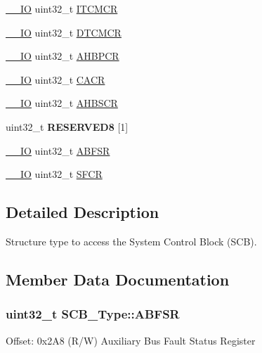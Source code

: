\begin{DoxyCompactItemize}
\item 
\hyperlink{core__sc300_8h_aec43007d9998a0a0e01faede4133d6be}{\+\_\+\+\_\+\+IO} uint32\+\_\+t \hyperlink{struct_s_c_b___type_a6f52bb11b40cad59e836366a43686d63}{I\+T\+C\+M\+CR}
\item 
\hyperlink{core__sc300_8h_aec43007d9998a0a0e01faede4133d6be}{\+\_\+\+\_\+\+IO} uint32\+\_\+t \hyperlink{struct_s_c_b___type_a1728cb36883856a3543286d9acfb8a0d}{D\+T\+C\+M\+CR}
\item 
\hyperlink{core__sc300_8h_aec43007d9998a0a0e01faede4133d6be}{\+\_\+\+\_\+\+IO} uint32\+\_\+t \hyperlink{struct_s_c_b___type_aa7154549803e08073983216c159f74e3}{A\+H\+B\+P\+CR}
\item 
\hyperlink{core__sc300_8h_aec43007d9998a0a0e01faede4133d6be}{\+\_\+\+\_\+\+IO} uint32\+\_\+t \hyperlink{struct_s_c_b___type_acc2c89b1b03bed0224952b05582ce397}{C\+A\+CR}
\item 
\hyperlink{core__sc300_8h_aec43007d9998a0a0e01faede4133d6be}{\+\_\+\+\_\+\+IO} uint32\+\_\+t \hyperlink{struct_s_c_b___type_ae1aa2246b75741ae5a7a965a66fa8d64}{A\+H\+B\+S\+CR}
\item 
uint32\+\_\+t {\bfseries R\+E\+S\+E\+R\+V\+E\+D8} \mbox{[}1\mbox{]}\hypertarget{struct_s_c_b___type_ab5acfe05b4c0828572919ef4e4e2de75}{}\label{struct_s_c_b___type_ab5acfe05b4c0828572919ef4e4e2de75}

\item 
\hyperlink{core__sc300_8h_aec43007d9998a0a0e01faede4133d6be}{\+\_\+\+\_\+\+IO} uint32\+\_\+t \hyperlink{struct_s_c_b___type_acb77619057d99c6d671915df3aa9b454}{A\+B\+F\+SR}
\item 
\hyperlink{core__sc300_8h_aec43007d9998a0a0e01faede4133d6be}{\+\_\+\+\_\+\+IO} uint32\+\_\+t \hyperlink{struct_s_c_b___type_a00ae0f2f224605dc8980a19d7624e533}{S\+F\+CR}
\end{DoxyCompactItemize}


\subsection{Detailed Description}
Structure type to access the System Control Block (S\+CB). 

\subsection{Member Data Documentation}
\subsubsection[{\texorpdfstring{A\+B\+F\+SR}{ABFSR}}]{ uint32\+\_\+t S\+C\+B\+\_\+\+Type\+::\+A\+B\+F\+SR}\hypertarget{struct_s_c_b___type_acb77619057d99c6d671915df3aa9b454}{}\label{struct_s_c_b___type_acb77619057d99c6d671915df3aa9b454}
Offset\+: 0x2\+A8 (R/W) Auxiliary Bus Fault Status Register 

